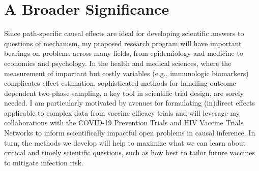 \section{A Broader Significance}

Since path-specific causal effects are ideal for developing scientific answers
to questions of mechanism, my proposed research program will have important
bearings on problems across many fields, from epidemiology and medicine to
economics and psychology. In the health and medical sciences, where the
measurement of important but costly variables (e.g., immunologic biomarkers)
complicates effect estimation, sophisticated methods for handling
outcome-dependent two-phase sampling, a key tool in scientific trial design, are
sorely needed. I am particularly motivated by avenues for formulating (in)direct
effects applicable to complex data from vaccine efficacy trials and will
leverage my collaborations with the COVID-19 Prevention Trials and HIV Vaccine
Trials Networks to inform scientifically impactful open problems in causal
inference. In turn, the methods we develop will help to maximize what we can
learn about critical and timely scientific questions, such as how best to tailor
future vaccines to mitigate infection risk.

